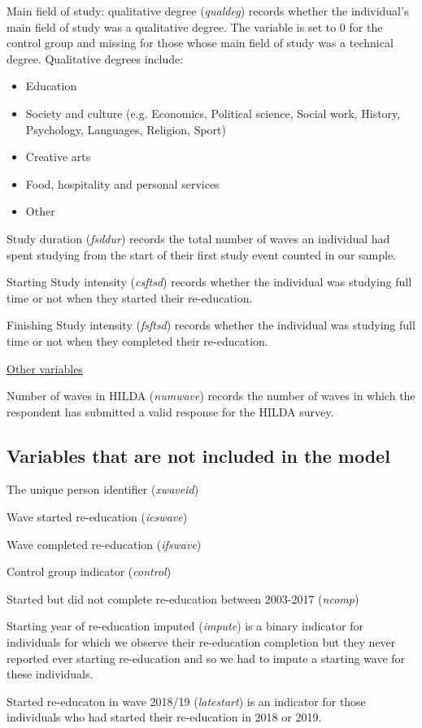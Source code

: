\documentclass[12pt, a4paper]{article}
\begin{document}
Main field of study: qualitative degree (\textit{qualdeg}) records whether the individual’s main field of study was a qualitative degree. The variable is set to 0 for the control group and missing for those whose main field of study was a technical degree. Qualitative degrees include:
\begin{itemize} 
  \item Education
  \item Society and culture (e.g. Economics, Political science, Social work, History, Psychology, Languages, Religion, Sport)
  \item Creative arts
  \item Food, hospitality and personal services
  \item Other
\end{itemize}  

Study duration (\textit{fsddur}) records the total number of waves an individual had spent studying from the start of their first study event counted in our sample. 

Starting Study intensity (\textit{csftsd}) records whether the individual was studying full time or not when they started their re-education. 

Finishing Study intensity (\textit{fsftsd}) records whether the individual was studying full time or not when they completed their re-education. 

\underline{Other variables}

Number of waves in HILDA (\textit{numwave}) records the number of waves in which the respondent has submitted a valid response for the HILDA survey. 

\subsection{Variables that are not included in the model}

The unique person identifier (\textit{xwaveid})

Wave started re-education (\textit{icswave}) 

Wave completed re-education (\textit{ifswave}) 

Control group indicator (\textit{control}) 

Started but did not complete re-education between 2003-2017 (\textit{ncomp}) 

Starting year of re-education imputed (\textit{impute}) is a binary indicator for individuals for which we observe their re-education completion but they never reported ever starting re-education and so we had to impute a starting wave for these individuals.  

Started re-educaton in wave 2018/19 (\textit{latestart}) is an indicator for those individuals who had started their re-education in 2018 or 2019. 
\end{document}
